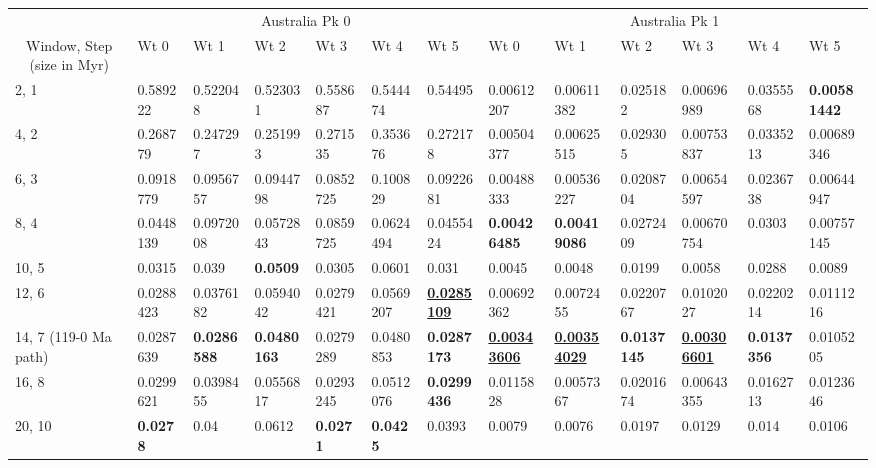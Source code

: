 \begin{table*}
{\begin{tabular}{|l|l|l|l|l|l|l|l|l|l|l|l|l|}
\hline
\multicolumn{1}{|c|}{} & \multicolumn{6}{c|}{Australia Pk 0} &
  \multicolumn{6}{c|}{Australia Pk 1} \\ \cline{2-13} 
\multicolumn{1}{|c|}{\multirow{-2}{*}{Window, Step (size in Myr)}} & Wt 0 & Wt 1 & Wt 2 & Wt 3 & Wt 4 & Wt 5 & Wt 0 & Wt 1 & Wt 2 & Wt 3 & Wt 4 & Wt 5 \\ \hline
2, 1 & 0.589222 & 0.522048 & 0.523031 & 0.558687 & 0.544474 & 0.54495 & 0.00612207 & 0.00611382 & 0.025182 & 0.00696989 & 0.0355568 & {\color[HTML]{34FF34} \textbf{0.00581442}} \\ \hline
4, 2 & 0.268779 & 0.247297 & 0.251993 & 0.271535 & 0.353676 & 0.272178 & 0.00504377 & 0.00625515 & 0.029305 & 0.00753837 & 0.0335213 & 0.00689346 \\ \hline
6, 3 & 0.0918779 & 0.0956757 & 0.0944798 & 0.0852725 & 0.100829 & 0.0922681 & 0.00488333 & 0.00536227 & 0.0208704 & 0.00654597 & 0.0236738 & 0.00644947 \\ \hline
8, 4 & 0.0448139 & 0.0972008 & 0.0572843 & 0.0859725 & 0.0624494 & 0.0455424 & {\color[HTML]{34FF34} \textbf{0.00426485}} & {\color[HTML]{32CB00} \textbf{0.00419086}} & 0.0272409 & 0.00670754 & 0.0303 & 0.00757145 \\ \hline
10, 5 & 0.0315 & 0.039 & {\color[HTML]{34FF34} \textbf{0.0509}} & 0.0305 & 0.0601 & 0.031 &
  0.0045 & 0.0048 & 0.0199 & 0.0058 & 0.0288 & 0.0089 \\ \hline
12, 6 & 0.0288423 & 0.0376182 & 0.0594042 & 0.0279421 & 0.0569207 & {\color[HTML]{009901} {\ul \textbf{0.0285109}}} & 0.00692362 & 0.0072455 & 0.0220767 & 0.0102027 & 0.0220214 & 0.0111216 \\ \hline
14, 7 (119-0 Ma path) & 0.0287639 & {\color[HTML]{34FF34} \textbf{0.0286588}} & {\color[HTML]{32CB00} \textbf{0.0480163}} & 0.0279289 & 0.0480853 & {\color[HTML]{32CB00} \textbf{0.0287173}} & {\color[HTML]{009901} {\ul \textbf{0.00343606}}} & {\color[HTML]{009901} {\ul
  \textbf{0.00354029}}} & {\color[HTML]{34FF34} \textbf{0.0137145}} & {\color[HTML]{009901} {\ul \textbf{0.00306601}}} & {\color[HTML]{34FF34} \textbf{0.0137356}} & 0.0105205 \\ \hline
16, 8 & 0.0299621 & 0.0398455 & 0.0556817 & 0.0293245 & 0.0512076 & {\color[HTML]{34FF34} \textbf{0.0299436}} & 0.0115828 & 0.0057367 & 0.0201674 & 0.00643355 & 0.0162713 & 0.0123646 \\ \hline
20, 10 & {\color[HTML]{34FF34} \textbf{0.0278}} & 0.04 & 0.0612 &
  {\color[HTML]{34FF34} \textbf{0.0271}} & {\color[HTML]{34FF34} \textbf{0.0425}} & 0.0393 & 0.0079 & 0.0076 &
  0.0197 & 0.0129 & 0.014 & 0.0106 \\ \hline

\end{tabular}}
\end{table*}
